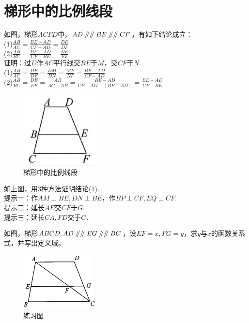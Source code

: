 \documentclass{ecnuthesis}
\newcommand\px{\mathrel{/\mkern-5mu/}}  %
\begin{document}
\section{梯形中的比例线段}
\begin{model}
    如图，梯形$ACFD$中，$AD\px \px BE\px \px CF$，有如下结论成立：\\
    (1)$\frac{AB}{AC}=\frac{BE-AD}{CF-AD}=\frac{DE}{DF}$ \\
    (2)$\frac{AB}{BC}=\frac{BE-AD}{CF-BE}=\frac{DE}{EF}$ \\
    证明：过$D$作$AC$平行线交$BE$于$M$，交$CF$于$N$. \\
    (1)$\frac{AB}{AC}=\frac{DE}{DF}=\frac{DM}{DN}=\frac{ME}{NF}=\frac{BE-AD}{CF-AD}$ \\
    (2)$\frac{AB}{BC}=\frac{DE}{EF}=\frac{AB}{AC-AB}=\frac{BE-AD}{CF-AD-(BE-AD)}=\frac{BE-AD}{CF-BE}$
\end{model}
\begin{figure}[H]
\centering
\includegraphics[width=4cm]{picture/808.png}
\caption{梯形中的比例线段}
\end{figure}
\begin{problem}
    如上图，用3种方法证明结论(1).\\
    提示一：作$AM\perp BE,DN\perp BE$，作$BP \perp CF,EQ \perp CF$. \\
    提示二：延长$AE$交$CF$于$G$. \\
    提示三：延长$CA,FD$交于$G$.
\end{problem}
\begin{problem}
    如图，梯形$ABCD,AD\px \px EG \px \px BC$，设$EF=x,FG=y$，求$y$与$x$的函数关系式，并写出定义域。\\
\end{problem}
\begin{figure}[H]
\centering
\includegraphics[width=4cm]{picture/851.png}
\caption{练习图}
\end{figure}
\clearpage
\end{document}
